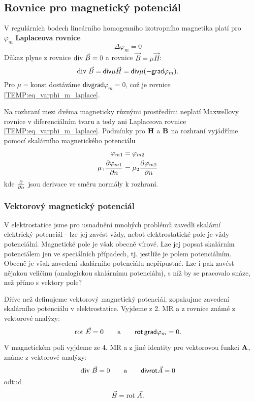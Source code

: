{    %
    \subsection{Rovnice pro magnetický potenciál}
      V regulárních bodech lineárního homogenního izotropního magnetika platí pro $\varphi_m$
      \textbf{Laplaceova rovnice}
      \begin{equation}\label{TEMP:eq_varphi_m_laplace}
        \Delta\varphi_m = 0
      \end{equation}      
      Důkaz plyne z rovnice $\mathrm{div}\;\vec{B} = 0$ a rovnice $\vec{B} = \mu\vec{H}$: $$\mathrm{div}\;\vec{B} =
      \textsf{div}\mu\vec{H} = \textsf{div}\mu(-\textsf{grad}\varphi_m).$$ Pro $\mu = \text{konst}$
      dostáváme $\textsf{div}\textsf{grad}\varphi_m = 0$, což je rovnice
      \ref{TEMP:eq_varphi_m_laplace}.
      
      Na rozhraní mezi dvěma magneticky různými prostředími neplatí Maxwellovy rovnice v
      diferenciálním tvaru a tedy ani Laplaceova rovnice \ref{TEMP:eq_varphi_m_laplace}. Podmínky 
      pro $\mathbf{H}$ a $\mathbf{B}$ na rozhraní vyjádříme pomocí skalárního magnetického potenciálu
       \begin{align}\label{TEMP:eq_mag_U_rozhrani}
         \varphi_{m1}                 &= \varphi_{m2} \\
         \mu_1\frac{\partial \varphi_{m1}}{\partial n}  &= \mu_2\frac{\partial \varphi_{m2}}{\partial n} 
       \end{align}
      kde $\frac{\partial }{\partial n}$ jsou derivace ve směru normály k rozhraní. 
    
    \subsubsection{Vektorový magnetický potenciál}
      V elektrostatice jsme pro usnadnění mnohých problémů zavedli skalární elektrický potenciál -
      lze jej zavést vždy, neboť elektrostatické pole je vždy potenciální. Magnetické pole je však
      obecně vírové. Lze jej popsat skalárním potenciálem jen ve speciálních případech, tj.
      jestliže je polem potenciálním. Obecně je však zavedení skalárního potenciálu nepřípustné.
      Lze i pak zavést nějakou veličinu (analogickou skalárnímu potenciálu), s níž by se pracovalo
      snáze, než přímo s vektory pole?
      
      Dříve než definujeme vektorový magnetický potenciál, zopakujme zavedení skalárního potenciálu
      v elektrostatice. Vyjdeme z 2. MR a z rovnice známé z vektorové analýzy: $$\mathrm{rot}\;\vec{E} = 0 \qquad
      \text{a} \qquad \textsf{rot}\,\textsf{grad}\varphi_m = 0.$$
      
      V magnetickém poli vyjdeme ze 4. MR a z jiné identity pro vektorovou funkci $\mathbf{A}$, známe z
      vektorové analýzy: $$\mathrm{div}\;\vec{B} = 0 \qquad \text{a} \qquad \textsf{div}\textsf{rot}\vec{A} =
      0$$ odtud
        \begin{equation}\label{TEMP:eq_B_rotA}
          \vec{B} = \mathrm{rot}\;\vec{A}.
        \end{equation}       
               
} %
\printbibliography[title={Seznam literatury}, heading=subbibliography]
